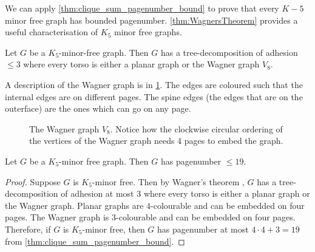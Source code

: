 We can apply \cref{thm:clique_sum_pagenumber_bound} to prove that every $K-5$ minor free graph has bounded pagenumber. \cref{thm:WagnersTheorem} provides a useful characterisation of $K_5$ minor free graphs. 
\begin{theorem}\label{thm:WagnersTheorem}
	Let \(G\) be a \(K_5\)-minor-free graph. Then \(G\) has a tree-decomposition of adhesion $\leq 3$ where every torso is either a planar graph or the Wagner graph \(V_8\).
\end{theorem}
A description of the Wagner graph is in \cref{fig:wagner}. The edges are coloured such that the internal edges are on different pages. The spine edges (the edges that are on the outerface) are the ones which can go on any page.
\begin{figure}[h!]
	\centering
	\begin{tikzpicture}[thick,scale=2, every node/.style={scale=2}]
		
	\end{tikzpicture}
	\caption[Wagner graph]{The Wagner graph $V_8$. Notice how the clockwise circular ordering of the vertices of the Wagner graph needs 4 pages to embed the graph. }\label{fig:wagner}
\end{figure}

\begin{theorem}
	Let \(G\) be a \(K_5\)-minor free graph. Then \(G\) has pagenumber \(\leq 19\).
\end{theorem}

\begin{proof}
	Suppose \(G\) is \(K_5\)-minor free. Then by Wagner's theorem \cite{wagnerUeberEigenschaftEbenen1937}, \(G\) has a tree-decomposition of adhesion at most 3 where every torso is either a planar graph or the Wagner graph.
	Planar graphs are \(4\)-colourable and can be embedded on four pages. The Wagner graph is \(3\)-colourable and can be embedded on four pages. Therefore, if \(G\) is \(K_5\)-minor free, then \(G\) has pagenumber at most \(4 \cdot 4 + 3 = 19\) from \cref{thm:clique_sum_pagenumber_bound}.
\end{proof}
